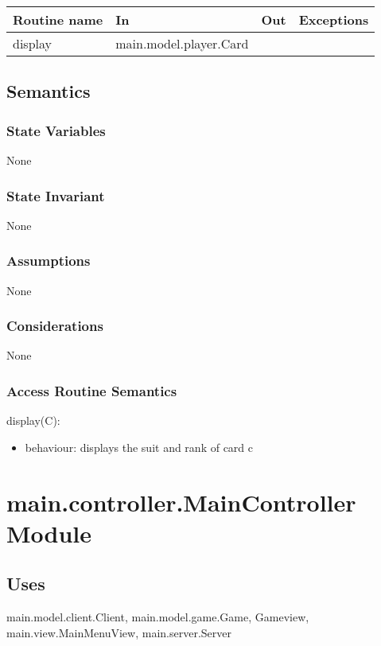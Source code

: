 \documentclass[12pt, titlepage]{article}
\begin{document}
\begin{tabular}{| l | l | l | p{5cm} |}
\hline
\textbf{Routine name} & \textbf{In} & \textbf{Out} & \textbf{Exceptions}\\
\hline
display & main.model.player.Card & &\\
\hline  
\end{tabular}

\subsection* {Semantics}

\subsubsection* {State Variables}

None

\subsubsection* {State Invariant}

None

\subsubsection* {Assumptions}

None

\subsubsection* {Considerations}

None

\subsubsection* {Access Routine Semantics}

\noindent display(C):
\begin{itemize}
\item behaviour: displays the suit and rank of card c
\end{itemize}


\section* {main.controller.MainController Module}
    \subsection* {Uses}
        main.model.client.Client, main.model.game.Game, Gameview, main.view.MainMenuView, main.server.Server
\end{document}
